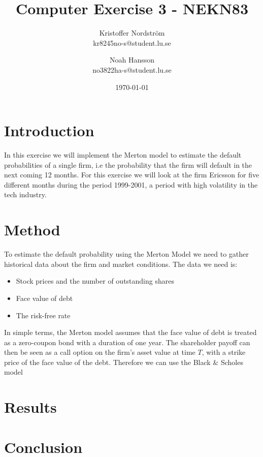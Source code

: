 \documentclass[a4paper]{article}
\title{Computer Exercise 3 - NEKN83}
\author{Kristoffer Nordström \\ kr8245no-s@student.lu.se \and  Noah Hansson \\ no3822ha-s@student.lu.se}
\date{\today}
\begin{document}
\maketitle

\section{Introduction}
In this exercise we will implement the Merton model to estimate the default probabilities of a single firm, i.e the probability that the firm will default in the next coming 12 months. For this exercise we will look at the firm Ericsson for five different months during the period 1999-2001, a period with high volatility in the tech industry.

\section{Method}
To estimate the default probability using the Merton Model we need to gather historical data about the firm and market conditions. The data we need is:
\begin{itemize}
    \item Stock prices and the number of outstanding shares
    \item Face value of debt
    \item The risk-free rate
\end{itemize}

In simple terms, the Merton model assumes that the face value of debt is treated as a zero-coupon bond with a duration of one year. The shareholder payoff can then be seen as a call option on the firm's asset value at time $T$, with a strike price of the face value of the debt. Therefore we can use the Black \& Scholes model

\section{Results}

\section{Conclusion}
\end{document}
